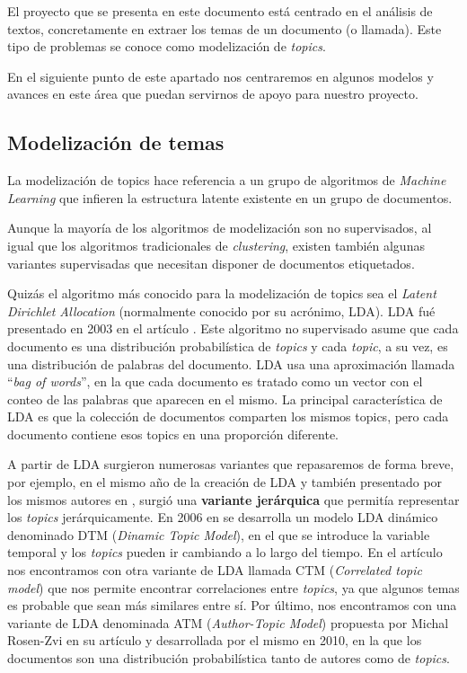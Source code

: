 El proyecto que se presenta en este documento está centrado en el análisis de textos, concretamente en extraer los temas de un documento (o llamada). Este tipo de problemas se conoce como modelización de \textit{topics}. 

En el siguiente punto de este apartado nos centraremos en algunos modelos y avances en este área que puedan servirnos de apoyo para nuestro proyecto. 


\subsection{Modelización de temas}
\label{section:arte:lda}
La modelización de topics hace referencia a un grupo de algoritmos de \textit{Machine Learning} que infieren la estructura latente existente en un grupo de documentos. 

Aunque la mayoría de los algoritmos de modelización son no supervisados, al igual que los algoritmos tradicionales de \textit{clustering}, existen también algunas variantes supervisadas que necesitan disponer de documentos etiquetados. 

Quizás el algoritmo más conocido para la modelización de topics sea el \textit{Latent Dirichlet Allocation} (normalmente conocido por su acrónimo, LDA). LDA fué presentado en 2003 en el artículo \cite{Blei_LDA}. Este algoritmo no supervisado asume que cada documento es una distribución probabilística de \textit{topics} y cada \textit{topic}, a su vez, es una distribución de palabras del documento. LDA usa una aproximación llamada ``\textit{bag of words}'', en la que cada documento es tratado como un vector con el conteo de las palabras que aparecen en el mismo. La principal característica de LDA es que la colección de documentos comparten los mismos topics, pero cada documento contiene esos topics en una proporción diferente. 


A partir de LDA surgieron numerosas variantes que repasaremos de forma breve, por ejemplo, en el mismo año de la creación de LDA y también presentado por los mismos autores en \cite{Blei_HTM}, surgió una \textbf{variante jerárquica} que permitía representar los \textit{topics} jerárquicamente. En 2006 en \cite{Blei_DTM} se desarrolla un modelo LDA dinámico denominado DTM (\textit{Dinamic Topic Model}), en el que se introduce la variable temporal y los \textit{topics} pueden ir cambiando a lo largo del tiempo. En el artículo \cite{Blei_CTM} nos encontramos con otra variante de LDA llamada CTM (\textit{Correlated topic model}) que nos permite encontrar correlaciones entre \textit{topics}, ya que algunos temas es probable que sean más similares entre sí. Por último, nos encontramos con una variante de LDA denominada ATM (\textit{Author-Topic Model}) propuesta  por	Michal Rosen-Zvi en su artículo \cite{Rosen-Zvi_AMA_2010}  y desarrollada por el mismo en 2010, en la que los documentos son una distribución probabilística tanto de autores como de \textit{topics}.    


